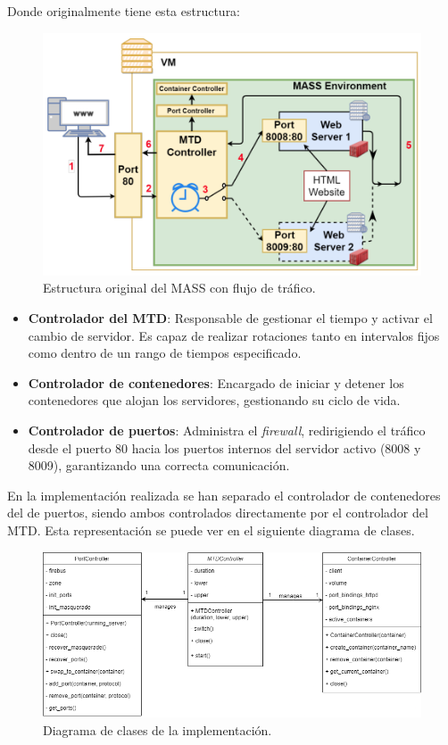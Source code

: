 Donde originalmente tiene esta estructura:
\begin{figure}[H]
    \centering
    \includegraphics[width=\linewidth]{./imagenes/mass-structure.png}
    \caption{Estructura original del MASS con flujo de tráfico.\cite{MTD-DARE-DIM-MASS}}
\end{figure}

\begin{itemize}
    \item \textbf{Controlador del MTD}: Responsable de gestionar el tiempo y activar el cambio de servidor. Es capaz de realizar rotaciones tanto en intervalos fijos como dentro de un rango de tiempos especificado.
    \item \textbf{Controlador de contenedores}: Encargado de iniciar y detener los contenedores que alojan los servidores, gestionando su ciclo de vida.
    \item \textbf{Controlador de puertos}: Administra el \textit{firewall}, redirigiendo el tráfico desde el puerto 80 hacia los puertos internos del servidor activo (8008 y 8009), garantizando una correcta comunicación.
\end{itemize}

En la implementación realizada se han separado el controlador de contenedores del de puertos, siendo ambos controlados directamente por el controlador del MTD. Esta representación se puede ver en el siguiente diagrama de clases.

\begin{figure}[H]
    \centering
    \includegraphics[width=\linewidth]{./imagenes/clases.png}
    \caption{Diagrama de clases de la implementación.}
\end{figure}

